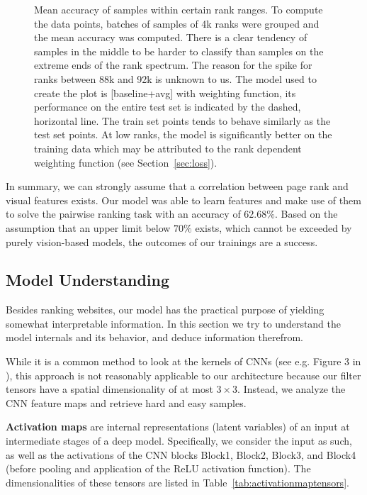 \begin{figure}
\begin{tikzpicture}
      \end{tikzpicture}
    \caption[Accuracy plotted against rank]{Mean accuracy of samples within certain rank ranges. To compute the data points, batches of samples of 4k ranks were grouped and the mean accuracy was computed. There is a clear tendency of samples in the middle to be harder to classify than samples on the extreme ends of the rank spectrum. The reason for the spike for ranks between 88k and 92k is unknown to us. The model used to create the plot is [baseline+avg] with weighting function, its performance on the entire test set is indicated by the dashed, horizontal line. The train set points tends to behave similarly as the test set points. At low ranks, the model is significantly better on the training data which may be attributed to the rank dependent weighting function (see Section~\ref{sec:loss}).}
    \label{fig:accvsrank}
\end{figure}

In summary, we can strongly assume that a correlation between page rank and visual features exists. Our model was able to learn features and make use of them to solve the pairwise ranking task with an accuracy of $62.68\%$. Based on the assumption that an upper limit below $70\%$ exists, which cannot be exceeded by purely vision-based models, the outcomes of our trainings are a success.

\subsection{Model Understanding}

Besides ranking websites, our model has the practical purpose of yielding somewhat interpretable information. In this section we try to understand the model internals and its behavior, and deduce information therefrom.

While it is a common method to look at the kernels of CNNs (see e.g. Figure 3 in \cite{krizhevsky:imagenet}), this approach is not reasonably applicable to our architecture because our filter tensors have a spatial dimensionality of at most $3\times3$. Instead, we analyze the CNN feature maps and retrieve hard and easy samples.

\textbf{Activation maps} are internal representations (latent variables) of an input at intermediate stages of a deep model. Specifically, we consider the input as such, as well as the activations of the CNN blocks Block1, Block2, Block3, and Block4 (before pooling and application of the ReLU activation function). The dimensionalities of these tensors are listed in Table~\ref{tab:activationmaptensors}.

